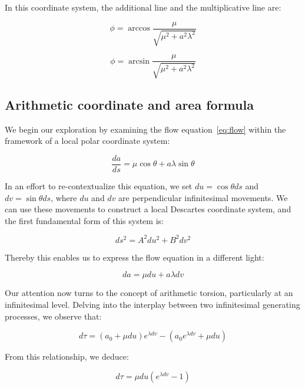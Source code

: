 In this coordinate system, the additional line and the multiplicative line are:

\begin{equation}
    \phi = \arccos \frac{\mu}{\sqrt {\mu^2 + a^2 \lambda^2}} \label{eq:additionalline}
\end{equation}

\begin{equation}
    \phi = \arcsin \frac{\mu}{\sqrt {\mu^2 + a^2 \lambda^2}}\label {eq:mulitiplcativeline}
\end{equation}

\subsection{Arithmetic coordinate and area formula}\label{subsec:descartes-coordinate}
We begin our exploration by examining the flow equation~\eqref{eq:flow} within the framework of a local polar coordinate system:

\begin{equation}
    \frac{da}{ds} = \mu \cos \theta + a \lambda \sin \theta
\end{equation}

In an effort to re-contextualize this equation, we set $du = \cos \theta ds$ and $dv = \sin \theta ds$,
where $du$ and $dv$ are perpendicular infinitesimal movements.
We can use these movements to construct a local Descartes coordinate system, and the first fundamental form of this system is:

\begin{equation}
    ds^2 = A^2 du^2 + B^2 dv^2
\end{equation}

Thereby this enables us to express the flow equation in a different light:

\begin{equation}
    da = \mu du + a \lambda dv
\end{equation}

Our attention now turns to the concept of arithmetic torsion, particularly at an infinitesimal level.
Delving into the interplay between two infinitesimal generating processes, we observe that:

\begin{equation}
    d\tau = (a_0 + \mu du) e^{\lambda dv} - (a_0 e^{\lambda dv} + \mu du)
\end{equation}

From this relationship, we deduce:

\begin{equation}
    d\tau = \mu du (e^{\lambda dv} - 1)
\end{equation}

